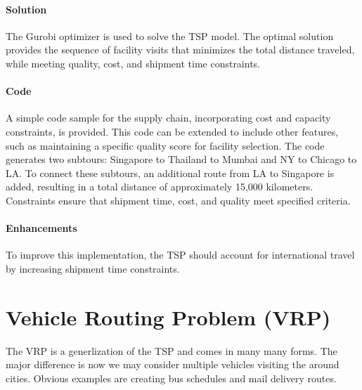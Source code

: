 \paragraph{Solution}
The Gurobi optimizer is used to solve the TSP model. The optimal solution provides the sequence of facility visits that minimizes the total distance traveled, while meeting quality, cost, and shipment time constraints.



\paragraph{Code}

A simple code sample for the supply chain, incorporating cost and capacity constraints, is provided. This code can be extended to include other features, such as maintaining a specific quality score for facility selection. The code generates two subtours: Singapore to Thailand to Mumbai and NY to Chicago to LA. To connect these subtours, an additional route from LA to Singapore is added, resulting in a total distance of approximately 15,000 kilometers. Constraints ensure that shipment time, cost, and quality meet specified criteria.



\paragraph{Enhancements}

To improve this implementation, the TSP should account for international travel by increasing shipment time constraints.



\section{Vehicle Routing Problem (VRP)}

The VRP is a generlization of the TSP and comes in many many forms.  The major difference is now we may consider multiple vehicles visiting the around cities.
Obvious examples are creating bus schedules and mail delivery routes.  


